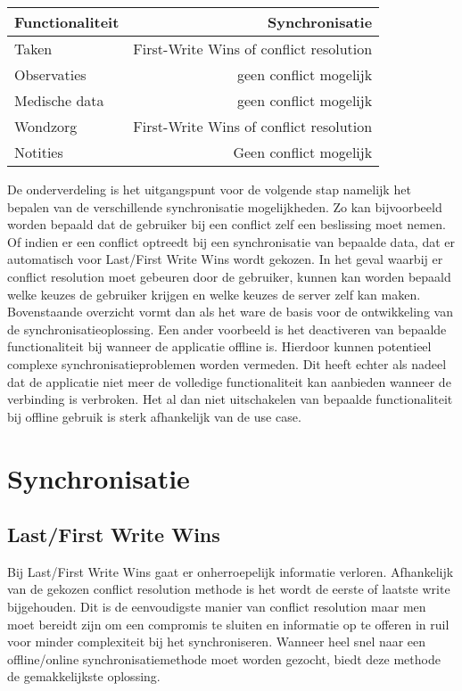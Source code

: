 \begin{center}
    \begin{tabular}{ l | r }
    \hline
    Functionaliteit & Synchronisatie \\ \hline
    Taken & First-Write Wins of conflict resolution \\
    Observaties & geen conflict mogelijk \\
    Medische data & geen conflict mogelijk \\
    Wondzorg & First-Write Wins of conflict resolution \\
    Notities & Geen conflict mogelijk \\
    \hline
    \end{tabular}
\end{center}

De onderverdeling is het uitgangspunt voor de volgende stap namelijk het bepalen van de verschillende synchronisatie mogelijkheden. Zo kan bijvoorbeeld worden bepaald dat de gebruiker bij een conflict zelf een beslissing moet nemen. Of indien er een conflict optreedt bij een synchronisatie van bepaalde data, dat er automatisch voor Last/First Write Wins wordt gekozen. In het geval waarbij er conflict resolution moet gebeuren door de gebruiker, kunnen kan worden bepaald welke keuzes de gebruiker krijgen en welke keuzes de server zelf kan maken. Bovenstaande overzicht vormt dan als het ware de basis voor de ontwikkeling van de synchronisatieoplossing. Een ander voorbeeld is het deactiveren van bepaalde functionaliteit bij wanneer de applicatie offline is. Hierdoor kunnen potentieel complexe synchronisatieproblemen worden vermeden. Dit heeft echter als nadeel dat de applicatie niet meer de volledige functionaliteit kan aanbieden wanneer de verbinding is verbroken. Het al dan niet uitschakelen van bepaalde functionaliteit bij offline gebruik is sterk afhankelijk van de use case.

\section{Synchronisatie}
\subsection{Last/First Write Wins}
Bij Last/First Write Wins gaat er onherroepelijk informatie verloren. Afhankelijk van de gekozen conflict resolution methode is het wordt de eerste of laatste write bijgehouden. Dit is de eenvoudigste manier van conflict resolution maar men moet bereidt zijn om een compromis te sluiten en informatie op te offeren in ruil voor minder complexiteit bij het synchroniseren. Wanneer heel snel naar een offline/online synchronisatiemethode moet worden gezocht, biedt deze methode de gemakkelijkste oplossing.
